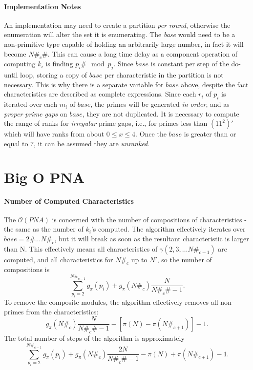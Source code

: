 \documentclass{article}
\begin{document}
\paragraph{Implementation Notes}	An implementation may need to create a partition \emph{per round}, otherwise the enumeration will alter the set it is enumerating. The \emph{base} would need to be a non-primitive type capable of holding an arbitrarily large number, in fact it will become $N\#_c\#$. This can cause a long time delay as a component operation of computing $k_i$ is finding $p_i\# \mod p_j$. Since $base$ is constant per step of the do-until loop, storing a copy of $base$  per characteristic in the partition is not necessary. This is why there is a separate variable for $base$ above, despite the fact characteristics are described as complete expressions. Since each $r_i$ of $p_i$ is iterated over each $m_i$ of $base$, the primes will be generated \emph{in order}, and as \emph{proper prime gaps} on $base$, they are not duplicated. It is necessary to compute the range of ranks for \emph{irregular} prime gaps, i.e., for primes less than $(11^2)'$ which will have ranks from about $0 \leq x \leq 4$. Once the $base$ is greater than or equal to $7$, it can be assumed they are \emph{unranked}.

\section{Big O PNA} \label{bigOpna}

\paragraph{Number of Computed Characteristics}	The $\mathcal{O}(PNA)$ is concerned with the number of compositions of characteristics - the same as the number of $k_i$'s computed. The algorithm effectively iterates over $base = 2\# \dots N\#_c$, but it will break as soon as the resultant characteristic is larger than N. This effectively means all characteristics of $\gamma(2, 3, \ldots N\#_{c-1})$ are computed, and all characteristics for $N\#_c$ up to $N'$, so the number of compositions is
	\begin{equation*} \sum_{p_i=2}^{N\#_{c-1}} g_{\pi}(p_i) + g_{\pi}(N\#_c) \frac{N}{N\#_c\#-1}.  \end{equation*}
To remove the composite modules, the algorithm effectively removes all non-primes from the characteristics:
	\begin{equation*}  g_{\pi}(N\#_c) \frac{N}{N\#_c\#-1} - [\pi(N) - \pi(N\#_{c+1})] - 1.  \end{equation*}
The total number of steps of the algorithm is approximately
	\begin{equation*} \sum_{p_i=2}^{N\#_{c-1}} g_{\pi}(p_i) + g_{\pi}(N\#_c) \frac{2 N}{N\#_c\#-1} - \pi(N) + \pi(N\#_{c+1}) - 1.  \end{equation*}
\end{document}
